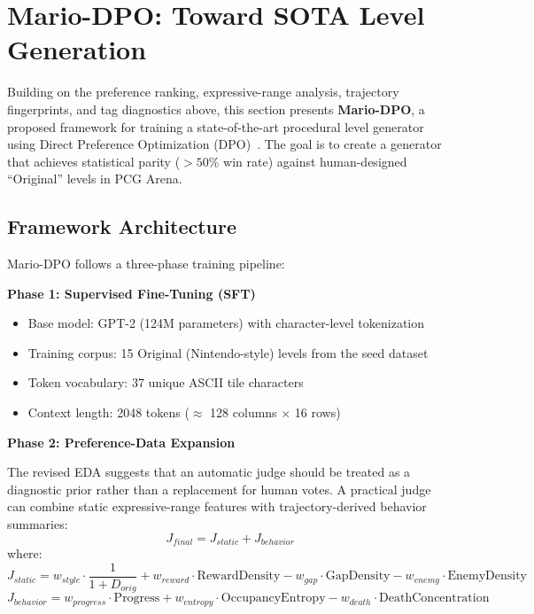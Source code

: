 \documentclass[11pt,a4paper]{article}
\theoremstyle{plain}
\theoremstyle{definition}
\theoremstyle{remark}
\begin{document}
\section{Mario-DPO: Toward SOTA Level Generation}
\label{sec:mario-dpo}

Building on the preference ranking, expressive-range analysis, trajectory fingerprints, and tag diagnostics above, this section presents \textbf{Mario-DPO}, a proposed framework for training a state-of-the-art procedural level generator using Direct Preference Optimization (DPO)~\cite{rafailov2023dpo}. The goal is to create a generator that achieves statistical parity ($>50\%$ win rate) against human-designed ``Original'' levels in PCG Arena.

\subsection{Framework Architecture}
\label{subsec:dpo-architecture}

Mario-DPO follows a three-phase training pipeline:

\textbf{Phase 1: Supervised Fine-Tuning (SFT)}
\begin{itemize}
    \item Base model: GPT-2 (124M parameters) with character-level tokenization
    \item Training corpus: 15 Original (Nintendo-style) levels from the seed dataset
    \item Token vocabulary: 37 unique ASCII tile characters
    \item Context length: 2048 tokens ($\approx$ 128 columns $\times$ 16 rows)
\end{itemize}

\textbf{Phase 2: Preference-Data Expansion}

The revised EDA suggests that an automatic judge should be treated as a diagnostic prior rather than a replacement for human votes. A practical judge can combine static expressive-range features with trajectory-derived behavior summaries:
\begin{equation}
J_{final} = J_{static} + J_{behavior}
\end{equation}
where:
\begin{equation}
J_{static} = w_{style} \cdot \frac{1}{1 + D_{orig}} + w_{reward} \cdot \text{RewardDensity} - w_{gap} \cdot \text{GapDensity} - w_{enemy} \cdot \text{EnemyDensity}
\end{equation}
\begin{equation}
J_{behavior} = w_{progress} \cdot \text{Progress} + w_{entropy} \cdot \text{OccupancyEntropy} - w_{death} \cdot \text{DeathConcentration}
\end{equation}
\end{document}
